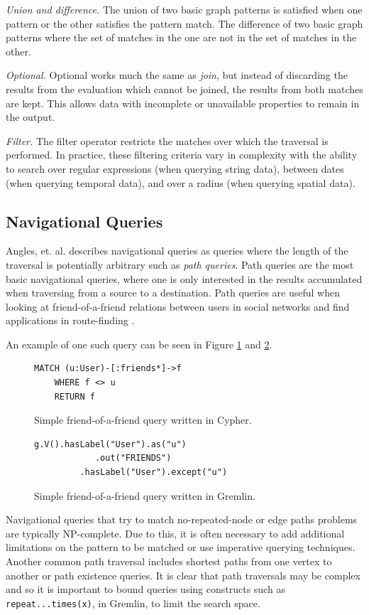 \textit{Union and difference. }
The union of two basic graph patterns is satisfied when one pattern or the other satisfies the pattern match. The difference of two basic graph patterns where the set of matches in the one are not in the set of matches in the other.

\textit{Optional. }
Optional works much the same as \emph{join}, but instead of discarding the results from the evaluation which cannot be joined, the results from both matches are kept. This allows data with incomplete or unavailable properties to remain in the output.

\textit{Filter. }
The filter operator restricts the matches over which the traversal is performed. In practice, these filtering criteria vary in complexity with the ability to search over regular expressions (when querying string data), between dates (when querying temporal data), and over a radius (when querying spatial data).

\subsection{Navigational Queries}

Angles, et. al. \cite{foundationsOfModernGql} describes navigational queries as queries where the length of the traversal is potentially arbitrary such as \emph{path queries}. Path queries are the most basic navigational queries, where one is only interested in the results accumulated when traversing from a source to a destination. Path queries are useful when looking at friend-of-a-friend relations between users in social networks and find applications in route-finding \cite{routeFinding}.

An example of one such query can be seen in Figure \ref{lst:cypherNav1} and \ref{lst:gremlinNav1}.

\begin{figure}[h]
    \centering
    \begin{lstlisting}[language=cypher]
    MATCH (u:User)-[:friends*]->f
    WHERE f <> u
    RETURN f
    \end{lstlisting}
    \caption{Simple friend-of-a-friend query written in Cypher.}
    \label{lst:cypherNav1}
\end{figure}

\begin{figure}[h]
    \centering
    \begin{lstlisting}[language=gremlin]
    g.V().hasLabel("User").as("u")
            .out("FRIENDS")
         .hasLabel("User").except("u")
    \end{lstlisting}
    \caption{Simple friend-of-a-friend query written in Gremlin.}
    \label{lst:gremlinNav1}
\end{figure}

Navigational queries that try to match no-repeated-node or edge paths problems are typically NP-complete. Due to this, it is often necessary to add additional limitations on the pattern to be matched or use imperative querying techniques. Another common path traversal includes shortest paths from one vertex to another or path existence queries. It is clear that path traversals may be complex and so it is important to bound queries using constructs such as \texttt{repeat...times(x)}, in Gremlin, to limit the search space.

